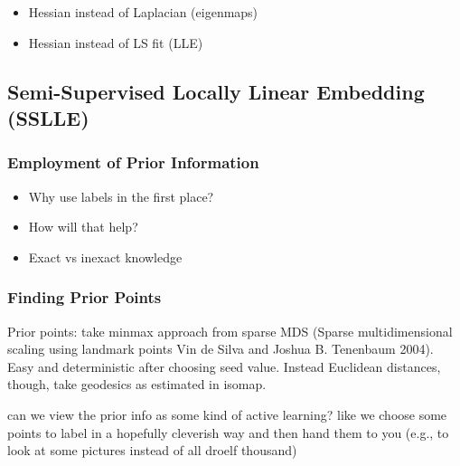 \begin{itemize}
  \item Hessian instead of Laplacian (eigenmaps)
  \item Hessian instead of LS fit (LLE)
\end{itemize}


\subsection{Semi-Supervised Locally Linear Embedding (SSLLE)}
\label{sslle}


\subsubsection{Employment of Prior Information}
\label{prior-info}


\begin{itemize}
  \item Why use labels in the first place?
  \item How will that help?
  \item Exact vs inexact knowledge
\end{itemize}


\subsubsection{Finding Prior Points}
\label{prior-points}

Prior points: take minmax approach from sparse MDS (Sparse multidimensional 
scaling using landmark points Vin de Silva and Joshua B. Tenenbaum 2004). 
Easy and deterministic after choosing seed value.
Instead Euclidean distances, though, take geodesics as estimated in isomap.

can we view the prior info as some kind of active learning? like we choose 
some points to label in a hopefully cleverish way and then hand them to you 
(e.g., to look at some pictures instead of all droelf thousand)


